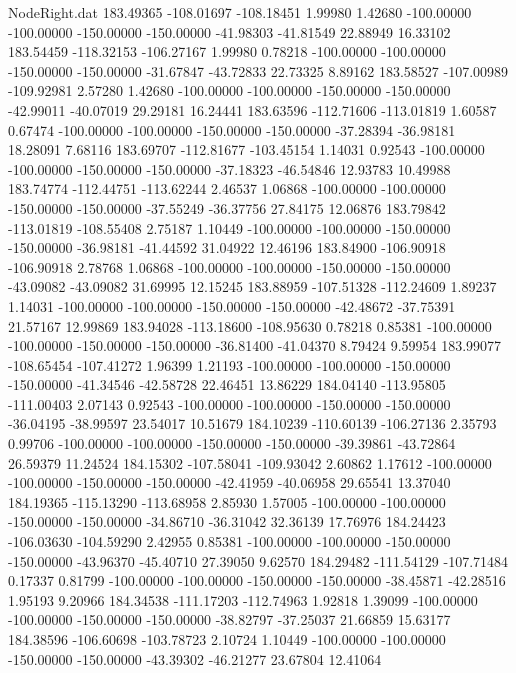 \begin{filecontents}{NodeRight.dat}
 183.49365 -108.01697 -108.18451     1.99980    1.42680 -100.00000 -100.00000 -150.00000 -150.00000  -41.98303  -41.81549   22.88949   16.33102
 183.54459 -118.32153 -106.27167     1.99980    0.78218 -100.00000 -100.00000 -150.00000 -150.00000  -31.67847  -43.72833   22.73325    8.89162
 183.58527 -107.00989 -109.92981     2.57280    1.42680 -100.00000 -100.00000 -150.00000 -150.00000  -42.99011  -40.07019   29.29181   16.24441
 183.63596 -112.71606 -113.01819     1.60587    0.67474 -100.00000 -100.00000 -150.00000 -150.00000  -37.28394  -36.98181   18.28091    7.68116
 183.69707 -112.81677 -103.45154     1.14031    0.92543 -100.00000 -100.00000 -150.00000 -150.00000  -37.18323  -46.54846   12.93783   10.49988
 183.74774 -112.44751 -113.62244     2.46537    1.06868 -100.00000 -100.00000 -150.00000 -150.00000  -37.55249  -36.37756   27.84175   12.06876
 183.79842 -113.01819 -108.55408     2.75187    1.10449 -100.00000 -100.00000 -150.00000 -150.00000  -36.98181  -41.44592   31.04922   12.46196
 183.84900 -106.90918 -106.90918     2.78768    1.06868 -100.00000 -100.00000 -150.00000 -150.00000  -43.09082  -43.09082   31.69995   12.15245
 183.88959 -107.51328 -112.24609     1.89237    1.14031 -100.00000 -100.00000 -150.00000 -150.00000  -42.48672  -37.75391   21.57167   12.99869
 183.94028 -113.18600 -108.95630     0.78218    0.85381 -100.00000 -100.00000 -150.00000 -150.00000  -36.81400  -41.04370    8.79424    9.59954
 183.99077 -108.65454 -107.41272     1.96399    1.21193 -100.00000 -100.00000 -150.00000 -150.00000  -41.34546  -42.58728   22.46451   13.86229
 184.04140 -113.95805 -111.00403     2.07143    0.92543 -100.00000 -100.00000 -150.00000 -150.00000  -36.04195  -38.99597   23.54017   10.51679
 184.10239 -110.60139 -106.27136     2.35793    0.99706 -100.00000 -100.00000 -150.00000 -150.00000  -39.39861  -43.72864   26.59379   11.24524
 184.15302 -107.58041 -109.93042     2.60862    1.17612 -100.00000 -100.00000 -150.00000 -150.00000  -42.41959  -40.06958   29.65541   13.37040
 184.19365 -115.13290 -113.68958     2.85930    1.57005 -100.00000 -100.00000 -150.00000 -150.00000  -34.86710  -36.31042   32.36139   17.76976
 184.24423 -106.03630 -104.59290     2.42955    0.85381 -100.00000 -100.00000 -150.00000 -150.00000  -43.96370  -45.40710   27.39050    9.62570
 184.29482 -111.54129 -107.71484     0.17337    0.81799 -100.00000 -100.00000 -150.00000 -150.00000  -38.45871  -42.28516    1.95193    9.20966
 184.34538 -111.17203 -112.74963     1.92818    1.39099 -100.00000 -100.00000 -150.00000 -150.00000  -38.82797  -37.25037   21.66859   15.63177
 184.38596 -106.60698 -103.78723     2.10724    1.10449 -100.00000 -100.00000 -150.00000 -150.00000  -43.39302  -46.21277   23.67804   12.41064

\end{filecontents}
